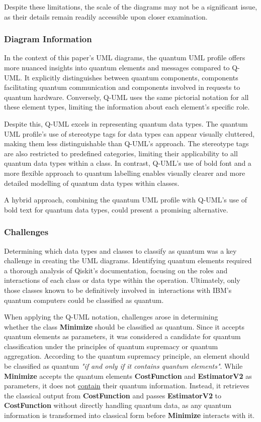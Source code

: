\documentclass{article}
\begin{document}
Despite these limitations, the scale of the diagrams may not be a significant issue, as their details remain readily accessible upon closer examination.

\subsubsection{Diagram Information}

In the context of this paper's UML diagrams, the quantum UML profile offers more nuanced insights into quantum elements and messages compared to Q-UML. It explicitly distinguishes between quantum components, components facilitating quantum communication and components involved in requests to quantum hardware. Conversely, Q-UML uses the same pictorial notation for all these element types, limiting the information about each element's specific role.

Despite this, Q-UML excels in representing quantum data types. The quantum UML profile’s use of stereotype tags for data types can appear visually cluttered, making them less distinguishable than Q-UML’s approach. The stereotype tags are also restricted to predefined categories, limiting their applicability to all quantum data types within a class. In contrast, Q-UML's use of bold font and a more flexible approach to quantum labelling enables visually clearer and more detailed modelling of quantum data types within classes.

A hybrid approach, combining the quantum UML profile with Q-UML's use of bold text for quantum data types, could present a promising alternative.

\subsubsection{Challenges}

Determining which data types and classes to classify as quantum was a key challenge in creating the UML diagrams. Identifying quantum elements required a thorough analysis of Qiskit’s documentation, focusing on the roles and interactions of each class or data type within the operation. Ultimately, only those classes known to be definitively involved in interactions with IBM's quantum computers could be classified as quantum. 

When applying the Q-UML notation, challenges arose in determining\\ whether the class \textbf{Minimize} should be classified as quantum. Since it accepts quantum elements as parameters, it was considered a candidate for quantum classification under the principles of quantum supremacy or quantum aggregation. According to the quantum supremacy principle, an element should be classified as quantum \textit{"if and only if it contains quantum elements"}\cite{Pérez-Castillo2022}. While \textbf{Minimize} accepts the quantum elements \textbf{CostFunction} and \textbf{EstimatorV2} as parameters, it does not \underline{contain} their quantum information. Instead, it retrieves the classical output from \textbf{CostFunction} and passes \textbf{EstimatorV2} to \textbf{CostFunction} without directly handling quantum data, as any quantum information is transformed into classical form before \textbf{Minimize} interacts with it.
\end{document}
